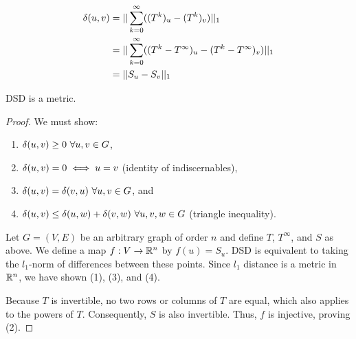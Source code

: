 \begin{align*}
  \delta(u,v) &= ||\sum_{k=0}^{\infty}((T^k)_u - (T^k)_v)||_1 \\
              &= ||\sum_{k=0}^{\infty}((T^k-T^\infty)_u - (T^k-T^\infty)_v)||_1 \\
              &= ||S_u - S_v||_1
\end{align*}

\begin{theorem}
  DSD is a metric.
\end{theorem}
\begin{proof}
  We must show:

  \begin{enumerate}
  \item $\delta(u,v)\geq 0 ~ \forall u,v \in G$,
  \item $\delta(u,v) = 0 \iff u = v$ (identity of indiscernables),
  \item $\delta(u,v) = \delta(v,u) ~\forall u,v \in G$, and
  \item $\delta(u,v) \leq \delta(u,w) + \delta(v,w) ~\forall u,v,w \in G$
    (triangle inequality).
  \end{enumerate}

  Let $G = (V,E)$ be an arbitrary graph of order $n$ and define $T$, $T^\infty$,
  and $S$ as above. We define a map $f : V \to \mathbb{R}^n$ by $f(u) = S_u$. DSD is
  equivalent to taking the $l_1$-norm of differences between these points. Since
  $l_1$ distance is a metric in $\mathbb{R}^n$, we have shown (1), (3), and (4).

  Because $T$ is invertible, no two rows or columns of $T$ are equal, which also
  applies to the powers of $T$. Consequently, $S$ is also invertible. Thus,
  $f$ is injective, proving (2).




\end{proof}


